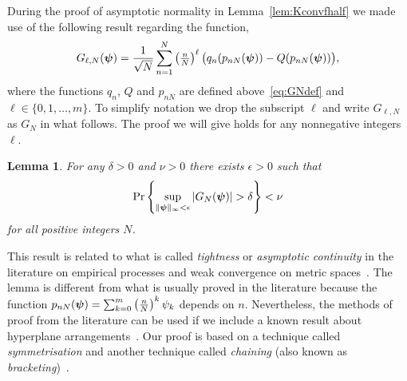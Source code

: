 \documentclass[aap]{imsart}
\newcommand{\prob}{\operatorname{Pr}}
\newcommand{\abs}[1]{\left\vert #1 \right\vert}
\newtheorem{lemma}{Lemma}
\begin{document}
During the proof of asymptotic normality in Lemma~\ref{lem:Kconvfhalf} we made use of the following result regarding the function,
\[
G_{\ell,N}(\boldsymbol{\psi}) = \frac{1}{\sqrt{N}} \sum_{n=1}^{N}\left( \tfrac{n}{N}\right)^\ell  \big(q_n(p_{nN}(\boldsymbol{\psi})) - Q(p_{nN}(\boldsymbol{\psi})) \big),
\]
where the functions $q_n$, $Q$ and $p_{nN}$ are defined above~\eqref{eq:GNdef} and $\ell \in \{0, 1, \dots, m\}$.  To simplify notation we drop the subscript $\ell$ and write $G_{\ell,N}$ as $G_N$ in what follows.  The proof we will give holds for any nonnegative integers $\ell$.

\begin{lemma}\label{lem:unifprobG}
For any $\delta >0$ and $\nu > 0$ there exists $\epsilon > 0$ such that
\[
\prob\left\{ \sup_{\|\psibf\|_{\infty} < \epsilon} \abs{ G_N(\psibf) } > \delta   \right\} < \nu %
\]
for all positive integers $N$.
\end{lemma}

This result is related to what is called \emph{tightness} or \emph{asymptotic continuity} in the literature on empirical processes and weak convergence on metric spaces~\cite{Billingsley1999_convergence_of_probability_measures,Dudley_unif_central_lim_th_1999,Shorak_emp_proc_stat_2009,van2009empirical}.  The lemma is different from what is usually proved in the literature because the function $p_{nN}(\boldsymbol{\psi}) = \sum_{k=0}^m\left( \tfrac{n}{N}\right)^k\psi_k$
depends on $n$.  Nevertheless, the methods of proof from the literature can be used if we include a known result about hyperplane arrangements~\cite[Ch. 5]{Chazelle_discrepency_method_2000}\cite[Ch. 6]{Matousek_lect_disc_geom_2002}. Our proof is based on a technique called \emph{symmetrisation} and another technique called \emph{chaining} (also known as \emph{bracketing})~\cite{Pollard_asymp_empi_proc_1989,van2009empirical}.
\end{document}
